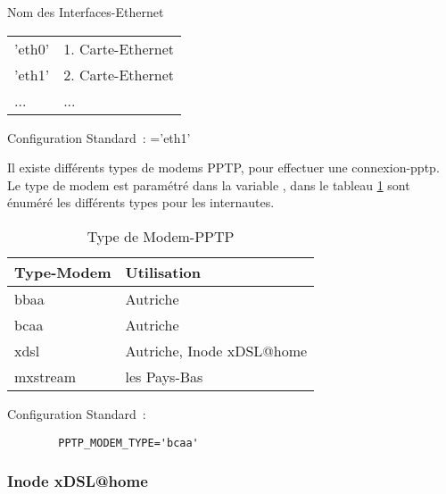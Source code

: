 \begin{description}




Nom des Interfaces-Ethernet

\begin{tabular}[h!]{ll}
  'eth0' & 1. Carte-Ethernet\\
  'eth1' & 2. Carte-Ethernet\\
   ...   &  ...\\
\end{tabular}

Configuration Standard~: ='eth1'


Il existe différents types de modems PPTP, pour effectuer une connexion-pptp.
Le type de modem est paramétré dans la variable ,
dans le tableau \ref{tab:pptp-modemtypen} sont énuméré les différents types
pour les internautes.

\begin{table}[htb]
  \centering
  \begin{tabular}{l|l}
    Type-Modem & Utilisation \\
    \hline
    bbaa & Autriche \\
    bcaa & Autriche \\
    xdsl & Autriche, Inode xDSL@home \\
    mxstream & les Pays-Bas
  \end{tabular}
  \caption{Type de Modem-PPTP}
  \label{tab:pptp-modemtypen}
\end{table}

        Configuration Standard~:

\begin{example}
\begin{verbatim}
        PPTP_MODEM_TYPE='bcaa'
\end{verbatim}
\end{example}

\end{description}

\subsubsection{Inode xDSL@home}

